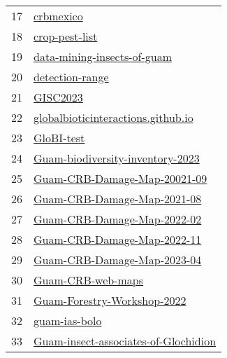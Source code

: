 \begin{longtable}{rl}
17 &                                                       \href{https://github.com/aubreymoore/crbmexico}{crbmexico} \\
18 &                                             \href{https://github.com/aubreymoore/crop-pest-list}{crop-pest-list} \\
19 &                   \href{https://github.com/aubreymoore/data-mining-insects-of-guam}{data-mining-insects-of-guam} \\
20 &                                           \href{https://github.com/aubreymoore/detection-range}{detection-range} \\
21 &                                                         \href{https://github.com/aubreymoore/GISC2023}{GISC2023} \\
22 &     \href{https://github.com/aubreymoore/globalbioticinteractions.github.io}{globalbioticinteractions.github.io} \\
23 &                                                     \href{https://github.com/aubreymoore/GloBI-test}{GloBI-test} \\
24 &         \href{https://github.com/aubreymoore/Guam-biodiversity-inventory-2023}{Guam-biodiversity-inventory-2023} \\
25 &                 \href{https://github.com/aubreymoore/Guam-CRB-Damage-Map-20021-09}{Guam-CRB-Damage-Map-20021-09} \\
26 &                   \href{https://github.com/aubreymoore/Guam-CRB-Damage-Map-2021-08}{Guam-CRB-Damage-Map-2021-08} \\
27 &                   \href{https://github.com/aubreymoore/Guam-CRB-Damage-Map-2022-02}{Guam-CRB-Damage-Map-2022-02} \\
28 &                   \href{https://github.com/aubreymoore/Guam-CRB-Damage-Map-2022-11}{Guam-CRB-Damage-Map-2022-11} \\
29 &                   \href{https://github.com/aubreymoore/Guam-CRB-Damage-Map-2023-04}{Guam-CRB-Damage-Map-2023-04} \\
30 &                                       \href{https://github.com/aubreymoore/Guam-CRB-web-maps}{Guam-CRB-web-maps} \\
31 &                   \href{https://github.com/aubreymoore/Guam-Forestry-Workshop-2022}{Guam-Forestry-Workshop-2022} \\
32 &                                               \href{https://github.com/aubreymoore/guam-ias-bolo}{guam-ias-bolo} \\
33 & \href{https://github.com/aubreymoore/Guam-insect-associates-of-Glochidion}{Guam-insect-associates-of-Glochidion} \\

\end{longtable}
